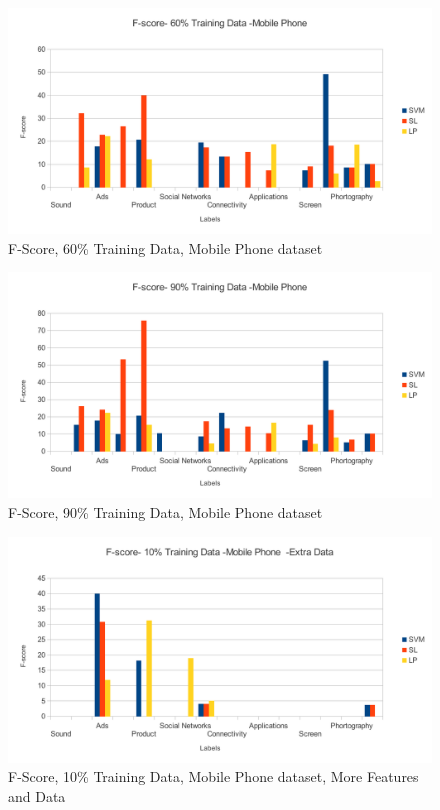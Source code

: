 \documentclass[4pt,a4paper,twocolumn]{article}
\begin{document}
\begin{figure}[]
  
  \centering
    \includegraphics[scale=0.7]{graphics/sony/halfData/fscore-60-sony}
    \caption{F-Score, 60\% Training Data, Mobile Phone dataset}
   \label{fig:sony_60_fscore_half}  
\end{figure}


\begin{figure}[]
  
  \centering
    \includegraphics[scale=0.7]{graphics/sony/halfData/fscore-90-sony}
    \caption{F-Score, 90\% Training Data, Mobile Phone dataset}
   \label{fig:sony_90_fscore_half}  
\end{figure}




\begin{figure}[]
  
  \centering
    \includegraphics[scale=0.7]{graphics/sony/moreData/fscore-10-sony}
    \caption{F-Score, 10\% Training Data, Mobile Phone dataset, More Features and Data}
   \label{fig:sony_10_fscore_more}  
\end{figure}
\end{document}
